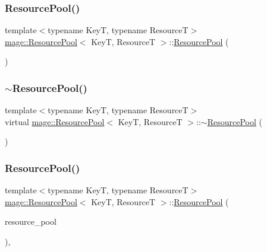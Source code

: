 \subsubsection{\texorpdfstring{Resource\+Pool()}{ResourcePool()}\hspace{0.1cm}{\footnotesize\ttfamily [1/3]}}
{\footnotesize\ttfamily template$<$typename KeyT, typename ResourceT$>$ \\
\hyperlink{classmage_1_1_resource_pool}{mage\+::\+Resource\+Pool}$<$ KeyT, ResourceT $>$\+::\hyperlink{classmage_1_1_resource_pool}{Resource\+Pool} (\begin{DoxyParamCaption}{ }\end{DoxyParamCaption})}

\hypertarget{classmage_1_1_resource_pool_ae4fff3d951818d417f77965c2db265f6}{}\label{classmage_1_1_resource_pool_ae4fff3d951818d417f77965c2db265f6} 
\subsubsection{\texorpdfstring{$\sim$\+Resource\+Pool()}{~ResourcePool()}}
{\footnotesize\ttfamily template$<$typename KeyT, typename ResourceT$>$ \\
virtual \hyperlink{classmage_1_1_resource_pool}{mage\+::\+Resource\+Pool}$<$ KeyT, ResourceT $>$\+::$\sim$\hyperlink{classmage_1_1_resource_pool}{Resource\+Pool} (\begin{DoxyParamCaption}{ }\end{DoxyParamCaption})\hspace{0.3cm}{\ttfamily [virtual]}}

\hypertarget{classmage_1_1_resource_pool_a82253c9c4adfc120a813dfe811dd5e91}{}\label{classmage_1_1_resource_pool_a82253c9c4adfc120a813dfe811dd5e91} 
\subsubsection{\texorpdfstring{Resource\+Pool()}{ResourcePool()}\hspace{0.1cm}{\footnotesize\ttfamily [2/3]}}
{\footnotesize\ttfamily template$<$typename KeyT, typename ResourceT$>$ \\
\hyperlink{classmage_1_1_resource_pool}{mage\+::\+Resource\+Pool}$<$ KeyT, ResourceT $>$\+::\hyperlink{classmage_1_1_resource_pool}{Resource\+Pool} (\begin{DoxyParamCaption}\item[{const \hyperlink{classmage_1_1_resource_pool}{Resource\+Pool}$<$ KeyT, ResourceT $>$ \&}]{resource\+\_\+pool }\end{DoxyParamCaption})\hspace{0.3cm}{\ttfamily [private]}, {\ttfamily [delete]}}

